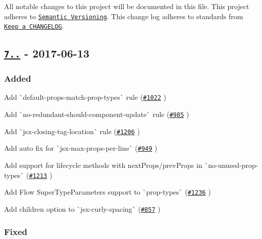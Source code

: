 All notable changes to this project will be documented in this file. This project adheres to \href{http://semver.org/}{\tt Semantic Versioning}. This change log adheres to standards from \href{http://keepachangelog.com}{\tt Keep a C\+H\+A\+N\+G\+E\+L\+OG}.

\subsection*{\href{https://github.com/yannickcr/eslint-plugin-react/compare/v7.0.1...v7.1.0}{\tt 7..} -\/ 2017-\/06-\/13}

\subsubsection*{Added}


\begin{DoxyItemize}
\item Add \`{}default-\/props-\/match-\/prop-\/types\`{} rule (\href{https://github.com/yannickcr/eslint-plugin-react/issues/1022}{\tt \#1022} )
\item Add \`{}no-\/redundant-\/should-\/component-\/update\`{} rule (\href{https://github.com/yannickcr/eslint-plugin-react/issues/985}{\tt \#985} )
\item Add \`{}jsx-\/closing-\/tag-\/location\`{} rule (\href{https://github.com/yannickcr/eslint-plugin-react/issues/1206}{\tt \#1206} )
\item Add auto fix for \`{}jsx-\/max-\/props-\/per-\/line\`{} (\href{https://github.com/yannickcr/eslint-plugin-react/pull/949}{\tt \#949} )
\item Add support for lifecycle methods with {\ttfamily next\+Props}/{\ttfamily prev\+Props} in \`{}no-\/unused-\/prop-\/types\`{} (\href{https://github.com/yannickcr/eslint-plugin-react/issues/1213}{\tt \#1213} )
\item Add Flow Super\+Type\+Parameters support to \`{}prop-\/types\`{} (\href{https://github.com/yannickcr/eslint-plugin-react/pull/1236}{\tt \#1236} )
\item Add {\ttfamily children} option to \`{}jsx-\/curly-\/spacing\`{} (\href{https://github.com/yannickcr/eslint-plugin-react/issues/857}{\tt \#857} )
\end{DoxyItemize}

\subsubsection*{Fixed}


